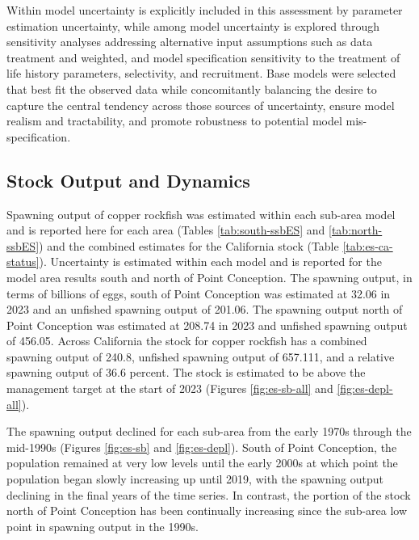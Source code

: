 \documentclass[11pt,
  english,
  letterpaper,
]{article}
\begin{document}
Within model uncertainty is explicitly included in this assessment by parameter estimation uncertainty, while among model uncertainty is explored through sensitivity analyses addressing alternative input assumptions such as data treatment and weighted, and model specification sensitivity to the treatment of life history parameters, selectivity, and recruitment. Base models were selected that best fit the observed data while concomitantly balancing the desire to capture the central tendency across those sources of uncertainty, ensure model realism and tractability, and promote robustness to potential model mis-specification.

\hypertarget{stock-output-and-dynamics}{%
\subsection*{Stock Output and Dynamics}\label{stock-output-and-dynamics}}

Spawning output of copper rockfish was estimated within each sub-area model and is reported here for each area (Tables \ref{tab:south-ssbES} and \ref{tab:north-ssbES}) and the combined estimates for the California stock (Table \ref{tab:es-ca-status}). Uncertainty is estimated within each model and is reported for the model area results south and north of Point Conception. The spawning output, in terms of billions of eggs, south of Point Conception was estimated at 32.06 in 2023 and an unfished spawning output of 201.06. The spawning output north of Point Conception was estimated at 208.74 in 2023 and unfished spawning output of 456.05. Across California the stock for copper rockfish has a combined spawning output of 240.8, unfished spawning output of 657.111, and a relative spawning output of 36.6 percent. The stock is estimated to be above the management target at the start of 2023 (Figures \ref{fig:es-sb-all} and \ref{fig:es-depl-all}).

The spawning output declined for each sub-area from the early 1970s through the mid-1990s (Figures \ref{fig:es-sb} and \ref{fig:es-depl}). South of Point Conception, the population remained at very low levels until the early 2000s at which point the population began slowly increasing up until 2019, with the spawning output declining in the final years of the time series. In contrast, the portion of the stock north of Point Conception has been continually increasing since the sub-area low point in spawning output in the 1990s.
\end{document}
